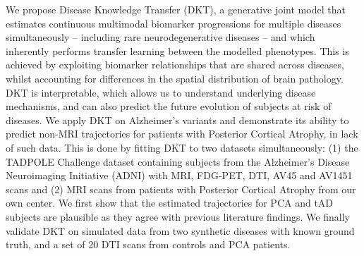 \documentclass{llncs}
\begin{document}
We propose Disease Knowledge Transfer (DKT), a generative joint model that estimates continuous multimodal biomarker progressions for multiple diseases simultaneously -- including rare neurodegenerative diseases -- and which inherently performs transfer learning between the modelled phenotypes. This is achieved by exploiting biomarker relationships that are shared across diseases, whilst accounting for differences in the spatial distribution of brain pathology. DKT is interpretable, which allows us to understand underlying disease mechanisms, and can also predict the future evolution of subjects at risk of diseases. We apply DKT on Alzheimer's variants and demonstrate its ability to predict non-MRI trajectories for patients with Posterior Cortical Atrophy, in lack of such data. This is done by fitting DKT to two datasets simultaneously: (1) the TADPOLE Challenge \cite{marinescu2018tadpole} dataset containing subjects from the Alzheimer's Disease Neuroimaging Initiative (ADNI) with MRI, FDG-PET, DTI, AV45 and AV1451 scans and (2) MRI scans from patients with Posterior Cortical Atrophy from our own center. We first show that the estimated trajectories for PCA and tAD subjects are plausible as they agree with previous literature findings. We finally validate DKT on simulated data from two synthetic diseases with known ground truth, and a set of 20 DTI scans from controls and PCA patients.
\end{document}
